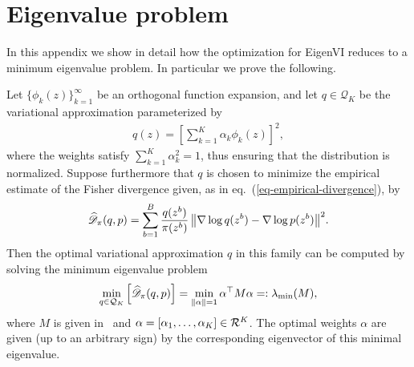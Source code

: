 
%

\section{Eigenvalue problem}
\label{app:eigen}

In this appendix we show in detail how the optimization for EigenVI reduces to a minimum eigenvalue problem. In particular we prove the following.

\begin{lemma}\label{lem:obj-min-eigen}
Let $\{\phi_k(z)\}_{k=1}^\infty$ be an orthogonal function expansion, and let $q\in\mathcal{Q}_K$ be the variational approximation parameterized by
     \begin{align}
        q(z) = \left[\sum_{k=1}^K \alpha_k \phi_k(z)\right]^2,
    \end{align}
where the weights satisfy $\sum_{k=1}^K \alpha_k^2=1$, thus ensuring that the distribution is normalized.
Suppose furthermore that $q$ is chosen to minimize the empirical estimate of the Fisher divergence given, as in eq.~(\ref{eq-empirical-divergence}), by
\begin{displaymath}
 \widehat{\mathscr{D}}_{\pi}(q, p) =
    \sum_{b=1}^B \frac{q(z^b)}{\pi(z^b)} \, \big\|\nabla \log q(z^b) - \nabla\log p(z^b)\big\|^2.
\end{displaymath}
Then the optimal variational approximation $q$ in this family
    can be computed by solving the minimum eigenvalue problem
    \begin{align}
        \label{eq:eigenVI-solution-ap}
\min_{q\in\mathcal{Q}_K}\left[\widehat{\mathscr{D}}_{\pi}(q,p)\right] = \min_{\|\alpha\|=1}
      \alpha^\top M \alpha
        =: \lambda_{\text{min}}(M),
      \end{align}
      where $M$ is given in~ and  $\alpha =[\alpha_1, \ldots, \alpha_K]\in \mathcal{R}^K$.
%
    The optimal weights $\alpha$ are given (up to an arbitrary sign) by the corresponding eigenvector of this minimal eigenvalue.
\end{lemma}

